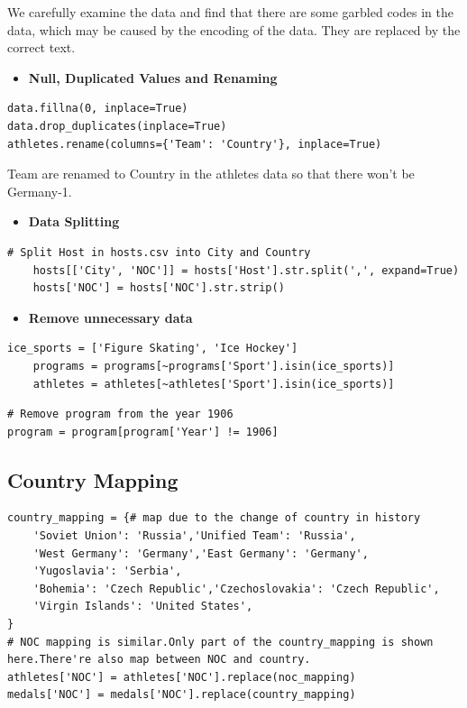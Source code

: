 We carefully examine the data and find that there are some garbled codes in the data, which may be caused by the encoding of the data. They are replaced by the correct text.

\begin{itemize}
    \item \textbf{Null, Duplicated Values and Renaming}
\end{itemize}

\begin{lstlisting}[caption=Data Cleaning]
data.fillna(0, inplace=True)
data.drop_duplicates(inplace=True)
athletes.rename(columns={'Team': 'Country'}, inplace=True)
\end{lstlisting}

Team are renamed to Country in the athletes data so that there won't be Germany-1.

\begin{itemize}
    \item \textbf{Data Splitting}
\end{itemize}

\begin{lstlisting}[caption=Data Splitting]
    # Split Host in hosts.csv into City and Country
    hosts[['City', 'NOC']] = hosts['Host'].str.split(',', expand=True)
    hosts['NOC'] = hosts['NOC'].str.strip()
    \end{lstlisting}

    \begin{itemize}
        \item \textbf{Remove unnecessary data}
    \end{itemize}
\begin{lstlisting}[caption=Remove Ice Sports]
    ice_sports = ['Figure Skating', 'Ice Hockey']
    programs = programs[~programs['Sport'].isin(ice_sports)]
    athletes = athletes[~athletes['Sport'].isin(ice_sports)]
\end{lstlisting}

\begin{lstlisting}[caption=Remove Program from 1906]
# Remove program from the year 1906
program = program[program['Year'] != 1906]    
\end{lstlisting}

\subsection{Country Mapping}

\begin{lstlisting}[caption=Country Mapping]
country_mapping = {# map due to the change of country in history
    'Soviet Union': 'Russia','Unified Team': 'Russia',
    'West Germany': 'Germany','East Germany': 'Germany',
    'Yugoslavia': 'Serbia',
    'Bohemia': 'Czech Republic','Czechoslovakia': 'Czech Republic',
    'Virgin Islands': 'United States',
}
# NOC mapping is similar.Only part of the country_mapping is shown here.There're also map between NOC and country.
athletes['NOC'] = athletes['NOC'].replace(noc_mapping)
medals['NOC'] = medals['NOC'].replace(country_mapping)
\end{lstlisting}

